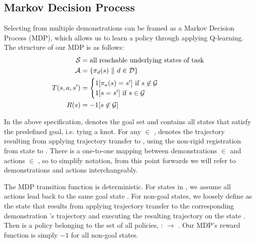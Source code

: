 \subsection{Markov Decision Process}
Selecting from multiple demonstrations can be framed as a Markov Decision
Process (MDP), which allows us to learn a policy through applying Q-learning. The structure of our MDP is as follows:
\begin{align*}
\mathcal{S}{} &=  \text{all reachable underlying states of task} \\
\mathcal{A}{} &= \{\pi_{d{}}(s{})\ \| \text{ } d{} \in \mathcal{D}{}\} \\
T{}(s{}, a{}, s'{}) &=
    \begin{cases}
    1[\pi_{a{}}(s{}) = s'{}] \text{ if } s{} \not \in \mathcal{G}{} \\
    1[s{} = s{}'] \text{ if } s{} \in \mathcal{G}{}
    \end{cases}\\
R(s{}) &= -1 {[ s{} \not \in \mathcal{G}{} ]} \\
\end{align*}

In the above specification, \goalset{} denotes the goal set and contains all
states that satisfy the predefined goal, i.e. tying a knot.
For any \demovar{} $\in$ \demoset{},  denotes the trajectory
resulting from applying trajectory transfer to , using
the non-rigid registration from state  to \statevar{}.
There is a one-to-one mapping between demonstrations \demovar{}
$\in$ \demoset{} and actions \actionvar{} $\in$ \actionset{}, so to simplify
notation, from this point forwards we will refer to demonstrations and
actions interchangeably.

The MDP transition function \transitionfn{} is deterministic. For states
\statevar{} in \goalset{}, we assume all actions lead back to the same
goal state \statevar{}. For
non-goal states, we loosely define \policysub{\actionvar}{\statevar{}}
as the state that results from applying trajectory transfer to the corresponding
demonstration \demovar{}'s trajectory and executing the resulting trajectory
on the state \statevar{}. Then \policysub{\actionvar{}}{\statevar{}} is a
policy belonging to the set of all policies, \policyset{} : \transitionfn{}
 \stateset{} $\rightarrow$ \stateset{}. Our MDP's reward function is
simply $-1$ for all non-goal states.

